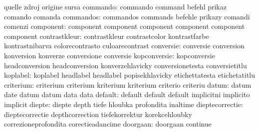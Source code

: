                            quelle                    zdroj
                           origine                   sursa
                 commando: commando                  command
                           befehl                    prikaz
                           comando                   comanda
                commandos: commandos                 commands
                           befehle                   prikazy
                           comandi                   comenzi
component: component                 component
           component                 component
           component                 component
            contrastkleur: contrastkleur             contrastcolor
                           kontrastfarbe             kontrastnibarva
                           colorecontrasto           culoarecontrast
                conversie: conversie                 conversion
                           konversion                konverze
                           conversione               conversie
             kopconversie: kopconversie              headconversion
                           headconversion            konverzehlavicky
                           conversionetesta          conversietitlu %
                 koplabel: koplabel                  headlabel
                           headlabel                 popisekhlavicky
                           etichettatesta            etichetatitlu %
                criterium: criterium                 criterium
                           kriterium                 kriterium
                           criterio                  criteriu
                    datum: datum                     date
                           datum                     datum
                           data                      data
                  default: default                   default
                           default                   implicitni
                           implicito                 implicit
                   diepte: diepte                    depth
                           tiefe                     hloubka
                           profondita                inaltime
          dieptecorrectie: dieptecorrectie           depthcorrection
                           tiefekorrektur            korekcehloubky
                           correzioneprofondita      corectieadancime
                 doorgaan: doorgaan                  continue
